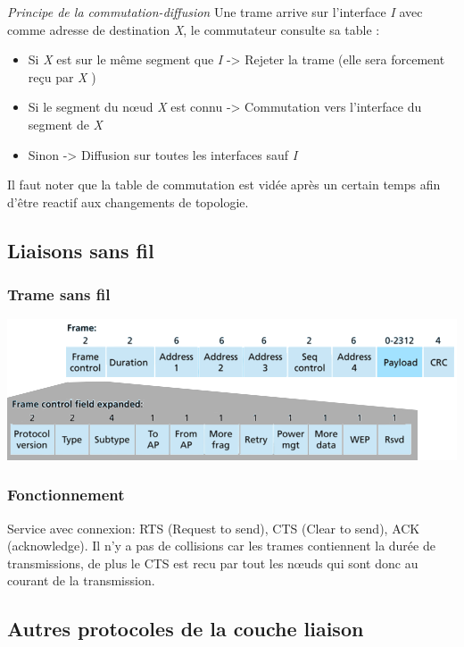 \documentclass[a4paper, 12pt, french]{article}
\begin{document}
	\emph{Principe de la commutation-diffusion} Une trame arrive sur l'interface \emph{I} avec comme adresse de destination \emph{X}, le commutateur consulte sa table :
	\begin{itemize}
		\item Si \emph{X} est sur le même segment que \emph{I} -> Rejeter la trame (elle sera forcement reçu par \emph{X} )
		\item Si le segment du nœud \emph{X} est connu -> Commutation vers l'interface du segment de \emph{X}
		\item Sinon -> Diffusion sur toutes les interfaces sauf \emph{I} 
	\end{itemize}

	Il faut noter que la table de commutation est vidée après un certain temps afin d'être reactif aux changements de topologie.

	\subsection{Liaisons sans fil}

	\subsubsection{Trame sans fil}

	\includegraphics[width=13.8cm]{reseau_trame_sans_fils}

	\subsubsection{Fonctionnement}

	Service avec connexion: RTS (Request to send), CTS (Clear to send), ACK (acknowledge). Il n'y a pas de collisions car les trames contiennent la durée de transmissions, de plus le CTS est recu par tout les nœuds qui sont donc au courant de la transmission.

	\subsection{Autres protocoles de la couche liaison}
\end{document}
